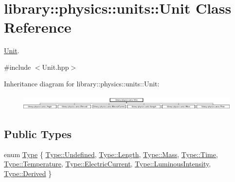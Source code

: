 \hypertarget{classlibrary_1_1physics_1_1units_1_1_unit}{}\section{library\+:\+:physics\+:\+:units\+:\+:Unit Class Reference}
\label{classlibrary_1_1physics_1_1units_1_1_unit}


\hyperlink{classlibrary_1_1physics_1_1units_1_1_unit}{Unit}.  




{\ttfamily \#include $<$Unit.\+hpp$>$}

Inheritance diagram for library\+:\+:physics\+:\+:units\+:\+:Unit\+:\begin{figure}[H]
\begin{center}
\leavevmode
\includegraphics[height=0.811594cm]{classlibrary_1_1physics_1_1units_1_1_unit}
\end{center}
\end{figure}
\subsection*{Public Types}
\begin{DoxyCompactItemize}
\item 
enum \hyperlink{classlibrary_1_1physics_1_1units_1_1_unit_a828bc1b6ad6fa5cbef904ea0fede986a}{Type} \{ \newline
\hyperlink{classlibrary_1_1physics_1_1units_1_1_unit_a828bc1b6ad6fa5cbef904ea0fede986aaec0fc0100c4fc1ce4eea230c3dc10360}{Type\+::\+Undefined}, 
\hyperlink{classlibrary_1_1physics_1_1units_1_1_unit_a828bc1b6ad6fa5cbef904ea0fede986aaba2a9c6c8c77e03f83ef8bf543612275}{Type\+::\+Length}, 
\hyperlink{classlibrary_1_1physics_1_1units_1_1_unit_a828bc1b6ad6fa5cbef904ea0fede986aaff2864d6f652ee0ac254814f1ae4f4a8}{Type\+::\+Mass}, 
\hyperlink{classlibrary_1_1physics_1_1units_1_1_unit_a828bc1b6ad6fa5cbef904ea0fede986aaa76d4ef5f3f6a672bbfab2865563e530}{Type\+::\+Time}, 
\newline
\hyperlink{classlibrary_1_1physics_1_1units_1_1_unit_a828bc1b6ad6fa5cbef904ea0fede986aaee7a8e262285ed49ea1b4e4ae11525bd}{Type\+::\+Temperature}, 
\hyperlink{classlibrary_1_1physics_1_1units_1_1_unit_a828bc1b6ad6fa5cbef904ea0fede986aa9a60fd92ac6161bffa549ef2cd17f05e}{Type\+::\+Electric\+Current}, 
\hyperlink{classlibrary_1_1physics_1_1units_1_1_unit_a828bc1b6ad6fa5cbef904ea0fede986aae91a9eb4f5dcc51ea18e180ea981d6ae}{Type\+::\+Luminous\+Intensity}, 
\hyperlink{classlibrary_1_1physics_1_1units_1_1_unit_a828bc1b6ad6fa5cbef904ea0fede986aa0e77a10e9579997fa646fbda4118e108}{Type\+::\+Derived}
 \}
\end{DoxyCompactItemize}
